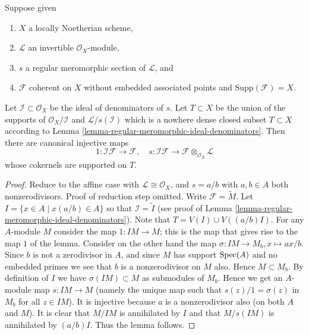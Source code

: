 \begin{lemma}
\label{lemma-make-maps-regular-section}
Suppose given
\begin{enumerate}
\item $X$ a locally Noetherian scheme,
\item $\mathcal{L}$ an invertible $\mathcal{O}_X$-module,
\item $s$ a regular meromorphic section of $\mathcal{L}$, and
\item $\mathcal{F}$ coherent on $X$
without embedded associated points and $\text{Supp}(\mathcal{F}) = X$.
\end{enumerate}
Let $\mathcal{I} \subset \mathcal{O}_X$ be the ideal of
denominators of $s$. Let $T \subset X$ be the union
of the supports of $\mathcal{O}_X/\mathcal{I}$ and
$\mathcal{L}/s(\mathcal{I})$ which is a nowhere dense closed
subset $T \subset X$ according to
Lemma \ref{lemma-regular-meromorphic-ideal-denominators}.
Then there are canonical injective maps
$$
1 : \mathcal{I}\mathcal{F} \to \mathcal{F}, \quad
s : \mathcal{I}\mathcal{F} \to \mathcal{F} \otimes_{\mathcal{O}_X}\mathcal{L}
$$
whose cokernels are supported on $T$.
\end{lemma}

\begin{proof}
Reduce to the affine case with $\mathcal{L} \cong \mathcal{O}_X$,
and $s = a/b$ with $a, b \in A$ both nonzerodivisors.
Proof of reduction step omitted.
Write $\mathcal{F} = \widetilde{M}$.
Let $I = \{x \in A \mid x(a/b) \in A\}$
so that $\mathcal{I} = \widetilde{I}$ (see
proof of Lemma \ref{lemma-regular-meromorphic-ideal-denominators}).
Note that $T = V(I) \cup V((a/b)I)$.
For any $A$-module $M$ consider the map $1 : IM \to M$; this is the
map that gives rise to the map $1$ of the lemma.
Consider on the other hand the map
$\sigma : IM \to M_b, x \mapsto ax/b$.
Since $b$ is not a zerodivisor in $A$, and since
$M$ has support $\mathop{\mathrm{Spec}}(A)$ and no embedded primes we
see that $b$ is a nonzerodivisor on $M$ also. Hence $M \subset M_b$.
By definition of $I$ we have $\sigma(IM) \subset M$ as submodules
of $M_b$. Hence we get an $A$-module map $s : IM \to M$ (namely the
unique map such that $s(z)/1 = \sigma(z)$ in $M_b$ for all $z \in IM$).
It is injective because $a$ is a nonzerodivisor also (on both $A$ and $M$).
It is clear that $M/IM$ is annihilated by $I$ and that
$M/s(IM)$ is annihilated by $(a/b)I$. Thus the lemma follows.
\end{proof}





